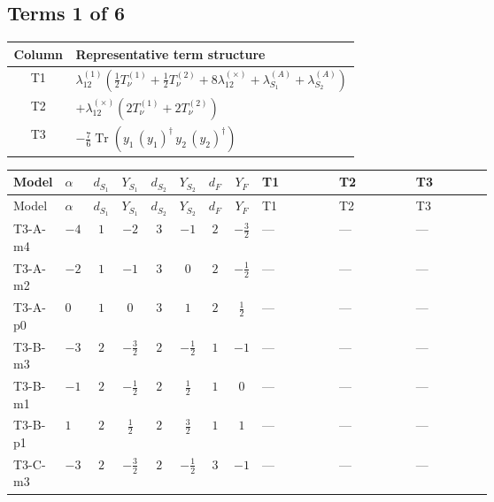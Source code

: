 \documentclass[8pt]{article}
\begin{document}
\begin{landscape}
\subsection*{Terms 1 of 6}
\begin{center}
\begin{tabular}{@{}c >{\raggedright\arraybackslash}p{0.82\linewidth}@{}}
\toprule
Column & Representative term structure \\
\midrule
T1 & \(\displaystyle {\lambda_{12}^{(1)}} \left(\frac{1}{2} T_{\nu}^{(1)}+\frac{1}{2} T_{\nu}^{(2)}+8 {\lambda_{12}^{(\times)}}+{\lambda_{S_1}^{(A)}}+{\lambda_{S_2}^{(A)}}\right)\) \\
\midrule
T2 & \(\displaystyle +{\lambda_{12}^{(\times)}} (2 T_{\nu}^{(1)}+2 T_{\nu}^{(2)})\) \\
\midrule
T3 & \(\displaystyle -\frac{7}{6} \operatorname{Tr}\!\left({y_1}\,\left({y_1}\right)^{\dagger}\,{y_2}\,\left({y_2}\right)^{\dagger}\right)\) \\
\midrule
\bottomrule
\end{tabular}
\end{center}
\smallskip
\tiny
\begin{longtable}{@{}llcccccc >{\raggedright\arraybackslash}p{0.21\linewidth} >{\raggedright\arraybackslash}p{0.21\linewidth} >{\raggedright\arraybackslash}p{0.21\linewidth}@{}}
\toprule
Model & $\alpha$ & $d_{S_1}$ & $Y_{S_1}$ & $d_{S_2}$ & $Y_{S_2}$ & $d_F$ & $Y_F$ & T1 & T2 & T3 \\
\midrule
\endfirsthead
\toprule
Model & $\alpha$ & $d_{S_1}$ & $Y_{S_1}$ & $d_{S_2}$ & $Y_{S_2}$ & $d_F$ & $Y_F$ & T1 & T2 & T3 \\
\midrule
\endhead
T3-A-m4 & $-4$ & $1$ & $-2$ & $3$ & $-1$ & $2$ & $-\frac{3}{2}$ & --- & --- & --- \\
\midrule
T3-A-m2 & $-2$ & $1$ & $-1$ & $3$ & $0$ & $2$ & $-\frac{1}{2}$ & --- & --- & --- \\
\midrule
T3-A-p0 & $0$ & $1$ & $0$ & $3$ & $1$ & $2$ & $\frac{1}{2}$ & --- & --- & --- \\
\midrule
T3-B-m3 & $-3$ & $2$ & $-\frac{3}{2}$ & $2$ & $-\frac{1}{2}$ & $1$ & $-1$ & --- & --- & --- \\
\midrule
T3-B-m1 & $-1$ & $2$ & $-\frac{1}{2}$ & $2$ & $\frac{1}{2}$ & $1$ & $0$ & --- & --- & --- \\
\midrule
T3-B-p1 & $1$ & $2$ & $\frac{1}{2}$ & $2$ & $\frac{3}{2}$ & $1$ & $1$ & --- & --- & --- \\
\midrule
T3-C-m3 & $-3$ & $2$ & $-\frac{3}{2}$ & $2$ & $-\frac{1}{2}$ & $3$ & $-1$ & --- & --- & --- \\

\end{longtable}
\end{landscape}
\end{document}

